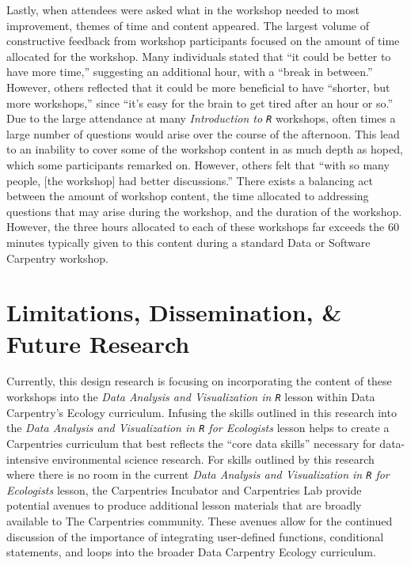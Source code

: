 \documentclass[12pt]{article}
\begin{document}
\quad Lastly, when attendees were asked what in the workshop needed to most improvement, themes of time and content appeared. The largest volume of constructive feedback from workshop participants focused on the amount of time allocated for the workshop. Many individuals stated that ``it could be better to have more time,'' suggesting an additional hour, with a ``break in between.'' However, others reflected that it could be more beneficial to have ``shorter, but more workshops,'' since ``it's easy for the brain to get tired after an hour or so.'' Due to the large attendance at many \emph{Introduction to \texttt{R}} workshops, often times a large number of questions would arise over the course of the afternoon. This lead to an inability to cover some of the workshop content in as much depth as hoped, which some participants remarked on. However, others felt that ``with so many people, [the workshop] had better discussions.'' There exists a balancing act between the amount of workshop content, the time allocated to addressing questions that may arise during the workshop, and the duration of the workshop. However, the three hours allocated to each of these workshops far exceeds the 60 minutes typically given to this content during a standard Data or Software Carpentry workshop. 

\section{Limitations, Dissemination, \& Future Research} 
\label{sec:future}


\quad Currently, this design research is focusing on incorporating the content of these workshops into the \emph{Data Analysis and Visualization in \texttt{R}} lesson within Data Carpentry's Ecology curriculum. Infusing the skills outlined in this research into the \emph{Data Analysis and Visualization in \texttt{R} for Ecologists} lesson helps to create a Carpentries curriculum that best reflects the ``core data skills'' necessary for data-intensive environmental science research. For skills outlined by this research where there is no room in the current \emph{Data Analysis and Visualization in \texttt{R} for Ecologists} lesson, the Carpentries Incubator and Carpentries Lab provide potential avenues to produce additional lesson materials that are broadly available to The Carpentries community. These avenues allow for the continued discussion of the importance of integrating user-defined functions, conditional statements, and loops into the broader Data Carpentry Ecology curriculum.    
\end{document}
